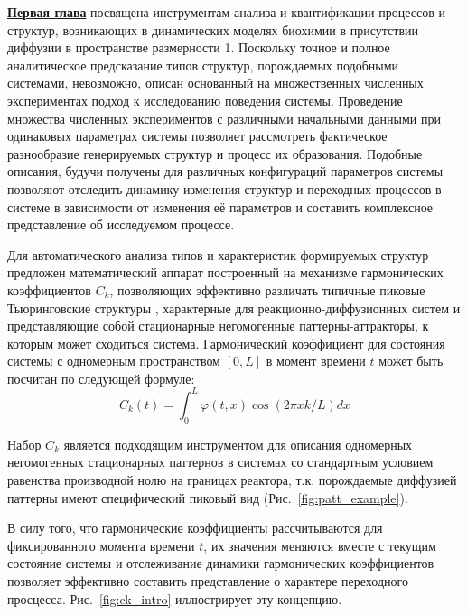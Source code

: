 \underline{\textbf{Первая глава}} посвящена инструментам анализа и квантификации процессов и структур, возникающих в динамических моделях биохимии в присутствии диффузии в пространстве размерности 1. Поскольку точное и полное аналитическое предсказание типов структур, порождаемых подобными системами, невозможно, описан основанный на множественных численных экспериментах подход к исследованию поведения системы. Проведение множества численных экспериментов с различными начальными данными при одинаковых параметрах системы позволяет рассмотреть фактическое разнообразие генерируемых структур и процесс их образования. Подобные описания, будучи получены для различных конфигураций параметров системы позволяют отследить динамику изменения структур и переходных процессов в системе в зависимости от изменения её параметров и составить комплексное представление об исследуемом процессе.

Для автоматического анализа типов и характеристик формируемых структур предложен математический аппарат построенный на механизме гармонических коэффициентов $C_k$, позволяющих эффективно различать типичные пиковые Тьюринговские структуры \cite{turing1990chemical}, характерные для реакционно-диффузионных систем и представляющие собой стационарные негомогенные паттерны-аттракторы, к которым может сходиться система. Гармонический коэффициент для состояния системы с одномерным пространством $[0, L]$ в момент времени $t$ может быть посчитан по следующей формуле:
\begin{equation}
    C_k(t) = \int_0^L \varphi(t, x) \cos (2 \pi x k / L) d x
\end{equation}

Набор $C_k$ является подходящим инструментом для описания одномерных негомогенных стационарных паттернов в системах со стандартным условием равенства производной нолю на границах реактора, т.к. порождаемые диффузией паттерны имеют специфический пиковый вид (Рис.~\ref{fig:patt_example}).

\begin{figure}[ht]
\end{figure}

В силу того, что гармонические коэффициенты рассчитываются для фиксированного момента времени $t$, их значения меняются вместе с текущим состояние системы и отслеживание динамики гармонических коэффициентов позволяет эффективно составить представление о характере переходного просцесса. Рис.~\ref{fig:ck_intro} иллюстрирует эту концепцию. 

